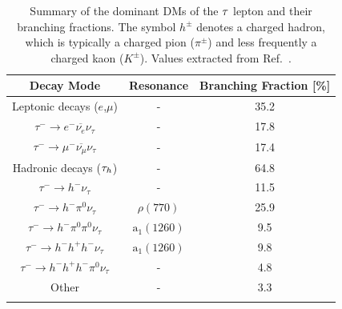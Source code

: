 \begin{table}[htbp]
\centering
\renewcommand{\arraystretch}{1.5} %
\begin{tabular}{|c|c|c|}
\hline
Decay Mode & Resonance & Branching Fraction [\%] \\ \hline \hline 
\rowcolor{verylightblue}
Leptonic decays ($e$,$\mu$)                               & - & 35.2 \\ 
\arrayrulecolor{lightgray} \hline
$\tau^- \rightarrow e^- \overline{\nu_e} \nu_\tau$ & - & 17.8 \\ 
\arrayrulecolor{lightgray} \hline
$\tau^- \rightarrow \mu^- \overline{\nu_\mu} \nu_\tau$ & - & 17.4 \\ 
\arrayrulecolor{lightgray}  \hline 
\rowcolor{verylightblue}
Hadronic decays ($\tau_h$)   & - & 64.8 \\ 
\arrayrulecolor{lightgray} \hline
$\tau^- \rightarrow h^- \nu_\tau$ & - & 11.5 \\ 
\arrayrulecolor{lightgray} \hline
$\tau^- \rightarrow h^- \pi^0\nu_\tau$ & $\rho(770)$ & 25.9 \\ 
\arrayrulecolor{lightgray} \hline
$\tau^- \rightarrow h^- \pi^0\pi^0\nu_\tau$ & $\mathrm{a_1}(1260)$ & 9.5 \\ 
\arrayrulecolor{lightgray} \hline
$\tau^- \rightarrow h^- h^+ h^- \nu_\tau$ & $\mathrm{a_1}(1260)$ & 9.8 \\ 
\arrayrulecolor{lightgray} \hline
$\tau^- \rightarrow h^- h^+ h^- \pi^0\nu_\tau$ & - & 4.8 \\ 
\arrayrulecolor{lightgray} \hline
Other & - & 3.3 \\ 
\arrayrulecolor{lightgray} \hline
\arrayrulecolor{black} \hline
\end{tabular}
\caption[Dominant $\PGt$ lepton decay modes and branching fractions]{Summary of the dominant \acp{DM} of the $\PGt$ lepton and their branching fractions. The symbol $h^\pm$ denotes a charged hadron, which is typically a charged pion ($\pi^\pm$) and less frequently a charged kaon ($K^\pm$). Values extracted from Ref.~\cite{ParticleMasses}.}
\label{Table:Chapter4_TauDecayModes}
\end{table}

